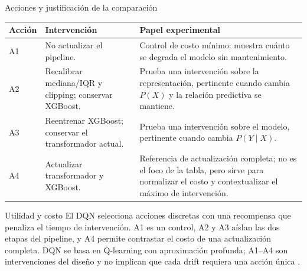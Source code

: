 \documentclass[aspectratio=169,10pt]{beamer}
\begin{document}
\begin{frame}{Acciones y justificación de la comparación}
\small
\setlength{\tabcolsep}{3pt}
\begin{tabular}{p{}p{}p{}}
\toprule
\textbf{Acción} & \textbf{Intervención} & \textbf{Papel experimental} \\
\midrule
A1 & No actualizar el pipeline. & Control de costo mínimo: muestra cuánto
se degrada el modelo sin mantenimiento. \\
A2 & Recalibrar mediana/IQR y clipping; conservar XGBoost. &
Prueba una intervención sobre la representación, pertinente cuando cambia
\(P(X)\) y la relación predictiva se mantiene. \\
A3 & Reentrenar XGBoost; conservar el transformador actual. &
Prueba una intervención sobre el modelo, pertinente cuando cambia
\(P(Y\mid X)\). \\
A4 & Actualizar transformador y XGBoost. &
Referencia de actualización completa; no es el foco de la tabla, pero sirve
para normalizar el costo y contextualizar el máximo de intervención. \\
\bottomrule
\end{tabular}

\vspace{0.6em}
\begin{block}{Utilidad y costo}
\footnotesize
El DQN selecciona acciones discretas con una recompensa que penaliza el tiempo
de intervención. A1 es un control, A2 y A3 aíslan las dos etapas del pipeline,
y A4 permite contrastar el costo de una actualización completa. DQN se basa en
Q-learning con aproximación profunda; A1--A4 son intervenciones del diseño y no
implican que cada drift requiera una acción única
\cite{mnih2015dqn,chen2016xgboost}.
\end{block}
\end{frame}
\end{document}
